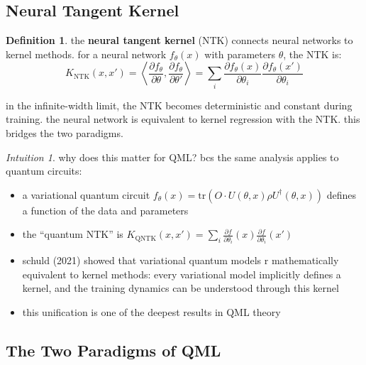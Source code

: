 \documentclass[11pt,a4paper]{article}
\theoremstyle{definition}
\newtheorem{definition}{Definition}[section]
\theoremstyle{remark}
\newtheorem*{intuition}{Intuition}
\begin{document}
\subsection{Neural Tangent Kernel}

\begin{definition}
the \textbf{neural tangent kernel} (NTK) connects neural networks to kernel methods. for a neural network $f_\theta(x)$ with parameters $\theta$, the NTK is:
\[
K_{\text{NTK}}(x, x') = \left\langle \frac{\partial f_\theta}{\partial \theta}, \frac{\partial f_\theta}{\partial \theta'} \right\rangle = \sum_i \frac{\partial f_\theta(x)}{\partial \theta_i} \frac{\partial f_\theta(x')}{\partial \theta_i}
\]
\end{definition}

in the infinite-width limit, the NTK becomes deterministic and constant during training. the neural network is equivalent to kernel regression with the NTK. this bridges the two paradigms.

\begin{intuition}
why does this matter for QML? bcs the same analysis applies to quantum circuits:

\begin{itemize}
    \item a variational quantum circuit $f_\theta(x) = \text{tr}(O \cdot U(\theta, x)\rho U^\dagger(\theta, x))$ defines a function of the data and parameters
    \item the ``quantum NTK'' is $K_{\text{QNTK}}(x, x') = \sum_i \frac{\partial f}{\partial \theta_i}(x) \frac{\partial f}{\partial \theta_i}(x')$
    \item schuld (2021) showed that variational quantum models r mathematically equivalent to kernel methods: every variational model implicitly defines a kernel, and the training dynamics can be understood through this kernel
    \item this unification is one of the deepest results in QML theory
\end{itemize}
\end{intuition}

\subsection{The Two Paradigms of QML}
\end{document}
